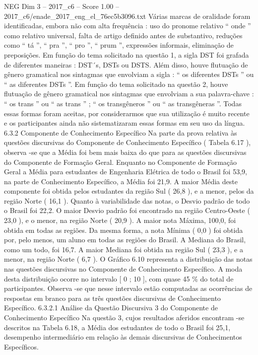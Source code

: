 \begin{textsample}{NEG Dim 3 – 2017\_c6 – Score 1.00 – 2017\_c6/enade\_2017\_eng\_el\_76ec5b3096.txt}
Várias marcas de oralidade foram identificadas, embora não com alta frequência : uso do pronome relativo “ onde ” como relativo universal, falta de artigo definido antes de substantivo, reduções como “ tá ”, “ pra ”, “ pro ”, “ prum ”, expressões informais, eliminação de preposições.
Em função do tema solicitado na questão 1, a sigla DST foi grafada de diferentes maneiras : DST´s, DSTs ou DSTS.
Além disso, houve flutuação de gênero gramatical nos sintagmas que envolviam a sigla : “ os diferentes DSTs ” ou “ as diferentes DSTs ”.
Em função do tema solicitado na questão 2, houve flutuação de gênero gramatical nos sintagmas que envolviam a sua palavra-chave : “ os trans ” ou “ as trans ” ; “ os transgêneros ” ou “ as transgêneras ”.
Todas essas formas foram aceitas, por considerarmos que sua utilização é muito recente e os participantes ainda não sistematizaram essas formas em seu uso da língua. 6.3.2 Componente de Conhecimento Específico Na parte da prova relativa às questões discursivas do Componente de Conhecimento Específico ( Tabela 6.17 ), observa -se que a Média foi bem mais baixa do que para as questões discursivas do Componente de Formação Geral.
Enquanto no Componente de Formação Geral a Média para estudantes de Engenharia Elétrica de todo o Brasil foi 53,9, na parte de Conhecimento Específico, a Média foi 21,9.
A maior Média deste componente foi obtida pelos estudantes da região Sul ( 26,8 ), e a menor, pelos da região Norte ( 16,1 ).
Quanto à variabilidade das notas, o Desvio padrão de todo o Brasil foi 22,2.
O maior Desvio padrão foi encontrado na região Centro-Oeste ( 23,0 ), e o menor, na região Norte ( 20,9 ).
A maior nota Máxima, 100,0, foi obtida em todas as regiões.
Da mesma forma, a nota Mínima ( 0,0 ) foi obtida por, pelo menos, um aluno em todas as regiões do Brasil.
A Mediana do Brasil, como um todo, foi 16,7.
A maior Mediana foi obtida na região Sul ( 23,3 ), e a menor, na região Norte ( 6,7 ).
O Gráfico 6.10 representa a distribuição das notas nas questões discursivas no Componente de Conhecimento Específico.
A moda desta distribuição ocorre no intervalo [ 0 ; 10 ], com quase 45 \% do total de participantes.
Observa -se que nesse intervalo estão computadas as ocorrências de respostas em branco para as três questões discursivas de Conhecimento Específico. 6.3.2.1 Análise da Questão Discursiva 3 do Componente de Conhecimento Específico Na questão 3, cujos resultados aferidos encontram -se descritos na Tabela 6.18, a Média dos estudantes de todo o Brasil foi 25,1, desempenho intermediário em relação às demais discursivas de Conhecimentos Específicos.

\end{textsample}
